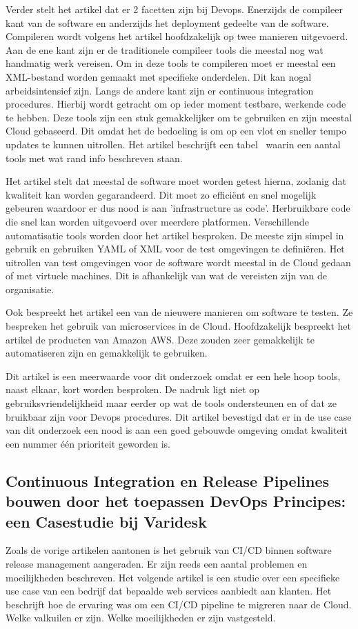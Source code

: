 Verder stelt het artikel \autocite{Ebert2016} dat er 2 facetten zijn bij Devops. Enerzijds de compileer kant van de software en anderzijds het deployment gedeelte van de software. Compileren wordt volgens het artikel hoofdzakelijk op twee manieren uitgevoerd. Aan de ene kant zijn er de traditionele compileer tools die meestal nog wat handmatig werk vereisen. Om in deze tools te compileren moet er meestal een XML-bestand worden gemaakt met specifieke onderdelen. Dit kan nogal arbeidsintensief zijn. Langs de andere kant zijn er continuous integration procedures. Hierbij wordt getracht om op ieder moment testbare, werkende code te hebben. Deze tools zijn een stuk gemakkelijker om te gebruiken en zijn meestal Cloud gebaseerd. Dit omdat het de bedoeling is om op een vlot en sneller tempo updates te kunnen uitrollen. Het artikel beschrijft een tabel~\textcite{Ebert2016} waarin een aantal tools met wat rand info beschreven staan.

Het artikel \autocite{Ebert2016} stelt dat meestal de software moet worden getest hierna, zodanig dat kwaliteit kan worden gegarandeerd. Dit moet zo efficiënt en snel mogelijk gebeuren waardoor er dus nood is aan 'infrastructure as code'. Herbruikbare code die snel kan worden uitgevoerd over meerdere platformen. Verschillende automatisatie tools worden door het artikel besproken. De meeste zijn simpel in gebruik en gebruiken YAML of XML voor de test omgevingen te definiëren. Het uitrollen van test omgevingen voor de software wordt meestal in de Cloud gedaan of met virtuele machines. Dit is afhankelijk van wat de vereisten zijn van de organisatie. 

Ook bespreekt het artikel \autocite{Ebert2016} een van de nieuwere manieren om software te testen. Ze bespreken het gebruik van microservices in de Cloud. Hoofdzakelijk bespreekt het artikel de producten van Amazon AWS. Deze zouden zeer gemakkelijk te automatiseren zijn en gemakkelijk te gebruiken.

Dit artikel \autocite{Ebert2016} is een meerwaarde voor dit onderzoek omdat er een hele hoop tools, naast elkaar, kort worden besproken. De nadruk ligt niet op gebruiksvriendelijkheid maar eerder op wat de tools ondersteunen en of dat ze bruikbaar zijn voor Devops procedures. Dit artikel bevestigd dat er in de use case van dit onderzoek een nood is aan een goed gebouwde omgeving omdat kwaliteit een nummer één prioriteit geworden is.

\subsection{Continuous Integration en Release Pipelines bouwen door het toepassen DevOps Principes: een Casestudie bij Varidesk}
Zoals de vorige artikelen aantonen is het gebruik van CI/CD binnen software release management aangeraden. Er zijn reeds een aantal problemen en moeilijkheden beschreven. Het volgende artikel \autocite{Debroy2018} is een studie over een specifieke use case van een bedrijf dat bepaalde web services aanbiedt aan klanten. Het beschrijft hoe de ervaring was om een CI/CD pipeline te migreren naar de Cloud. Welke valkuilen er zijn. Welke moeilijkheden er zijn vastgesteld.

